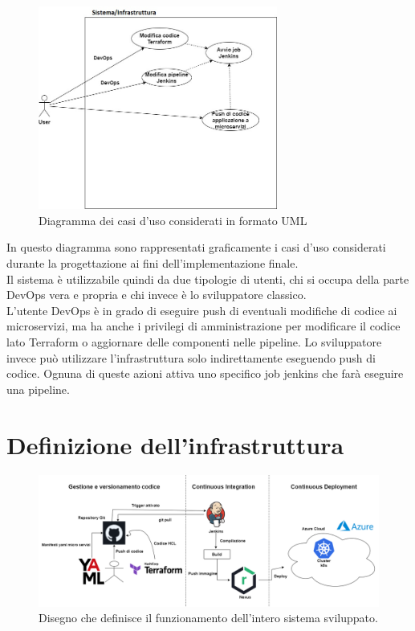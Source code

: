 \documentclass[a4paper,12pt]{report}
\begin{document}
\begin{figure}[h]
	\includegraphics[width=0.7\textwidth]{casi_uso}
    \caption{Diagramma dei casi d'uso considerati in formato UML}
    \label{fig:casi_uso}
\end{figure}
In questo diagramma sono rappresentati graficamente i casi d'uso considerati durante la progettazione ai fini dell'implementazione finale.\\
Il sistema è utilizzabile quindi da due tipologie di utenti, chi si occupa della parte DevOps vera e propria e chi invece è lo sviluppatore classico.\\
L'utente DevOps è in grado di eseguire push di eventuali modifiche di codice ai microservizi, ma ha anche i privilegi di amministrazione per modificare il codice lato Terraform o aggiornare delle componenti nelle pipeline. Lo sviluppatore invece può utilizzare l'infrastruttura solo indirettamente eseguendo push di codice. Ognuna di queste azioni attiva uno specifico job jenkins che farà eseguire una pipeline.\\
\section{Definizione dell'infrastruttura}

\begin{figure}[h]
	\includegraphics[width=1.0\textwidth]{disegno_struttura_infra}
    \caption{Disegno che definisce il funzionamento dell'intero sistema sviluppato.}
    \label{fig:disegno_struttura_infra}
\end{figure}
\end{document}
